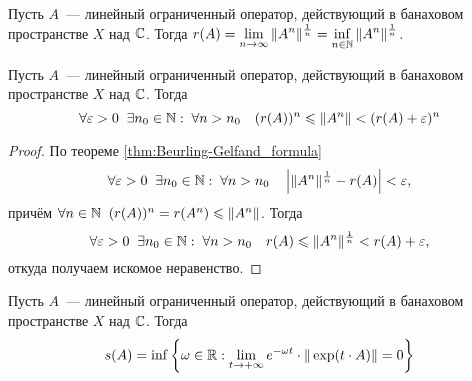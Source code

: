 \begin{theorem}
    \label{thm:Beurling-Gelfand_formula}
    Пусть $ A $~--- линейный ограниченный оператор, действующий в банаховом пространстве $ X $ над $ \mathbb{C} $.
    Тогда $ \displaystyle r(A) = \lim_{n \to \infty} \| A^n \|^{\frac{1}{n}} = \inf_{n \in \mathbb{N}} \| A^n \|^{\frac{1}{n}} $.
\end{theorem}

\begin{corollary}
    \label{cor:spectral_radius_norm_bounds}
    Пусть $ A $~--- линейный ограниченный оператор, действующий в банаховом пространстве $ X $ над $ \mathbb{C} $.
    Тогда
    \[
        \forall \varepsilon > 0 \;\; \exists n_0 \in \mathbb{N}: \; \forall n > n_0 \quad (r(A))^n \leqslant \| A^n \| < (r(A) + \varepsilon)^n
    \]
\end{corollary}

\begin{proof}
    По теореме \ref{thm:Beurling-Gelfand_formula}
    \[
        \forall \varepsilon > 0 \;\; \exists n_0 \in \mathbb{N}: \; \forall n > n_0 \quad \left| \| A^n \|^{\frac{1}{n}} - r(A) \right| < \varepsilon,
    \]
    причём $ \forall n \in \mathbb{N} \;\; (r(A))^n = r(A^n) \leqslant \| A^n \| $.
    Тогда
    \[
        \forall \varepsilon > 0 \;\; \exists n_0 \in \mathbb{N}: \; \forall n > n_0 \quad r(A) \leqslant \| A^n \|^{\frac{1}{n}} < r(A) + \varepsilon,
    \]
    откуда получаем искомое неравенство.
\end{proof}

\begin{lemma}
    \label{lem:operator_exponential_norm_convergence}
    Пусть $ A $~--- линейный ограниченный оператор, действующий в банаховом пространстве $ X $ над $ \mathbb{C} $.
    Тогда
    \[
        s(A) = \inf \left \{ \omega \in \mathbb{R}: \lim_{t \to +\infty} e^{-\omega t} \cdot \| \exp(t \cdot A) \| = 0 \right \}
    \]
\end{lemma}

